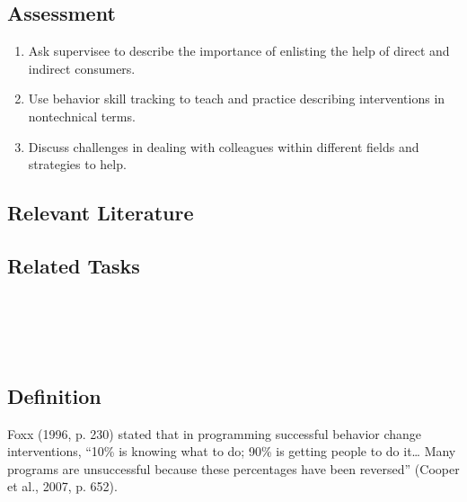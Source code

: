 \subsection{Assessment}
\begin{enumerate}
\item Ask supervisee to describe the importance of enlisting the help of direct and indirect consumers.
\item Use behavior skill tracking to teach and practice describing interventions in nontechnical terms.
\item Discuss challenges in dealing with colleagues within different fields and strategies to help.
\end{enumerate}
%
\subsection{Relevant Literature}
\begin{refsection}
\nocite{test,alang2017police,clayton2018black}
\printbibliography[heading=none]
\end{refsection} 
%                         
\subsection{Related Tasks}
\fourgSeven{}\\
\fourkNine{}\\
\fourkTen{}\\
%
%
%
%
%
%
%
\section[\fourkNine{}]{\fourkNine{}%
              }
\subsection{Definition}
Foxx (1996, p. 230) stated that in programming successful behavior change interventions, ``10\% is knowing what to do; 90\% is getting people to do it… Many programs are unsuccessful because these percentages have been reversed'' (Cooper et al., 2007, p. 652). 

